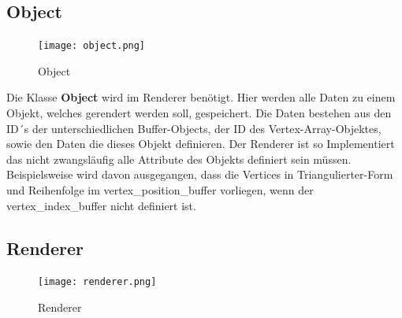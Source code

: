 \subsection{Object}

	\begin{figure}[H]
	\centering
	\texttt{[image: object.png]}
	\caption{Object}
	\label{fig5}
	\end{figure}

\noindent Die Klasse \textbf{Object} wird im Renderer benötigt. Hier werden alle Daten zu einem Objekt, welches gerendert werden soll, gespeichert. Die Daten bestehen aus den ID´s der unterschiedlichen Buffer-Objects, der ID des Vertex-Array-Objektes, sowie den Daten die dieses Objekt definieren. Der Renderer ist so Implementiert das nicht zwangsläufig alle Attribute des Objekts definiert sein müssen. Beispielsweise wird davon ausgegangen, dass die Vertices in Triangulierter-Form und Reihenfolge im vertex\_position\_buffer vorliegen, wenn der vertex\_index\_buffer nicht definiert ist.


\subsection{Renderer}


	\begin{figure}[H]
	\centering
	\texttt{[image: renderer.png]}
	\caption{Renderer}
	\label{fig6}
	\end{figure}


